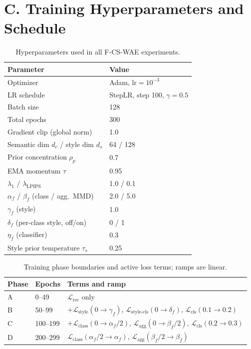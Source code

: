 \documentclass[letterpaper]{article} %
\newcommand{\ours}{F-CS-WAE}
\begin{document}
\section{C. Training Hyperparameters and Schedule}

\begin{table}[h]
\centering
\small
\caption{Hyperparameters used in all \ours{} experiments.}
\label{tab:hyperparameters}
\begin{tabular}{ll}
\toprule
Parameter & Value \\
\midrule
Optimizer & Adam, $\mathrm{lr}=10^{-3}$ \\
LR schedule & StepLR, step 100, $\gamma=0.5$ \\
Batch size & 128 \\
Total epochs & 300 \\
Gradient clip (global norm) & 1.0 \\
Semantic dim $d_c$ / style dim $d_s$ & 64 / 128 \\
Prior concentration $\rho_p$ & 0.7 \\
EMA momentum $\tau$ & 0.95 \\
$\lambda_1$ / $\lambda_{\mathrm{LPIPS}}$ & 1.0 / 0.1 \\
$\alpha_f$ / $\beta_f$ (class / agg.\ MMD) & 2.0 / 5.0 \\
$\gamma_f$ (style) & 1.0 \\
$\delta_f$ (per-class style, off/on) & 0 / 1 \\
$\eta_f$ (classifier) & 0.3 \\
Style prior temperature $\tau_s$ & 0.25 \\
\bottomrule
\end{tabular}
\end{table}

\begin{table}[h]
\centering
\scriptsize
\setlength{\tabcolsep}{2pt}
\caption{Training phase boundaries and active loss terms; ramps are linear.}
\label{tab:schedule}
\begin{tabular}{lll}
\toprule
Phase & Epochs & Terms and ramp \\
\midrule
A & 0--49   & $\mathcal{L}_{\mathrm{rec}}$ only \\
B & 50--99  & $+\mathcal{L}_{\mathrm{style}}(0{\to}\gamma_f)$,
              $\mathcal{L}_{\mathrm{style\text{-}cls}}(0{\to}\delta_f)$,
              $\mathcal{L}_{\mathrm{cls}}(0.1{\to}0.2)$ \\
C & 100--199 & $+\mathcal{L}_{\mathrm{class}}(0{\to}\alpha_f/2)$,
               $\mathcal{L}_{\mathrm{agg}}(0{\to}\beta_f/2)$,
               $\mathcal{L}_{\mathrm{cls}}(0.2{\to}0.3)$ \\
D & 200--299 & $\mathcal{L}_{\mathrm{class}}(\alpha_f/2{\to}\alpha_f)$,
               $\mathcal{L}_{\mathrm{agg}}(\beta_f/2{\to}\beta_f)$ \\
\bottomrule
\end{tabular}
\end{table}
\end{document}
